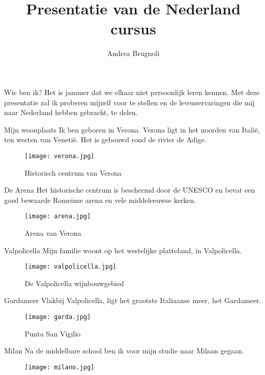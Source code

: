 \documentclass{beamer}
\title{Presentatie van de Nederland cursus}
\author[A.~Brugnoli]{Andrea Brugnoli} %
\institute[UT]{Department of Robotics and Mechatronics,\\ University of Twente}
\begin{document}
	
	\maketitle
	
	\begin{frame}{Wie ben ik?}
		Het is jammer dat we elkaar niet persoonlijk leren kennen. Met deze presentatie zal ik proberen mijzelf voor te stellen en de levenservaringen die mij naar Nederland hebben gebracht, te delen. 
	\end{frame}

	
	\begin{frame}{Mijn woonplaats}
		Ik ben geboren in Verona. Verona ligt in het noorden van Italië, ten westen van Venetië. Het is gebouwd rond de rivier de Adige.
	\begin{figure}
		\centering
		\texttt{[image: verona.jpg]}
		\caption{Historisch centrum van Verona}
	\end{figure}
	\end{frame}

	\begin{frame}{De Arena}
		Het historische centrum is beschermd door de UNESCO en bevat een goed bewaarde Romeinse arena en vele middeleeuwse kerken.
		\begin{figure}
			\centering
			\texttt{[image: arena.jpg]}
			\caption{Arena van Verona}
		\end{figure}
	\end{frame}	

	\begin{frame}{Valpolicella}
		Mijn familie woont op het westelijke platteland, in Valpolicella.
		\begin{figure}
			\centering
			\texttt{[image: valpolicella.jpg]}
			\caption{De Valpolicella wijnbouwgebied}
		\end{figure}
	\end{frame}	

	\begin{frame}{Gardameer}
		Vlakbij Valpolicella, ligt het grootste Italiaanse meer, het Gardameer.
	\begin{figure}
		\centering
		\texttt{[image: garda.jpg]}
		\caption{Punta San Vigilio}
	\end{figure}
	\end{frame}

	\begin{frame}{Milan}
		Na de middelbare school ben ik voor mijn studie naar Milaan gegaan.
		\begin{figure}
			\centering
			\texttt{[image: milano.jpg]}
		\end{figure}
	\end{frame}
\end{document}

